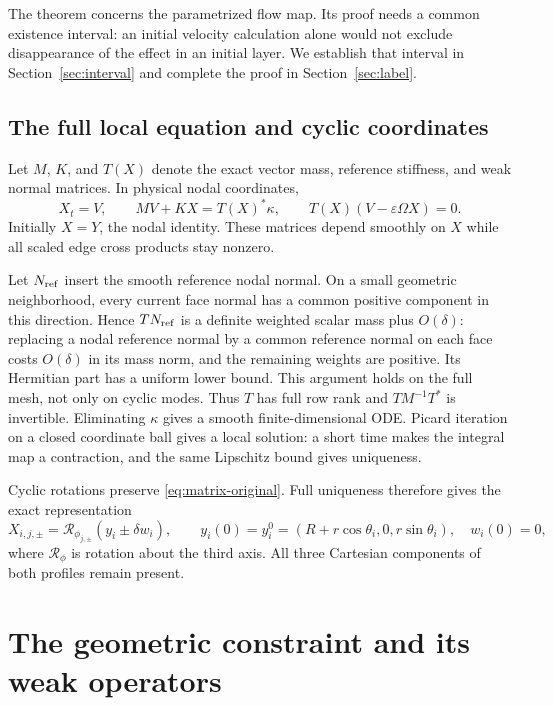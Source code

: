 \documentclass[11pt,a4paper]{article}
\numberwithin{equation}{section}
\theoremstyle{remark}
\begin{document}
The theorem concerns the parametrized flow map. Its proof needs a
common existence interval: an initial velocity calculation alone
would not exclude disappearance of the effect in an initial layer.
We establish that interval in Section~\ref{sec:interval} and complete
the proof in Section~\ref{sec:label}.

\subsection{The full local equation and cyclic coordinates}

Let \(M\), \(K\), and \(T(X)\) denote the exact vector mass, reference
stiffness, and weak normal matrices. In physical nodal coordinates,
\begin{equation}\label{eq:matrix-original}
 X_t=V,\qquad MV+KX=T(X)^*\kappa,\qquad
 T(X)(V-\varepsilon\Omega X)=0 .
\end{equation}
Initially \(X=Y\), the nodal identity. These matrices depend smoothly
on \(X\) while all scaled edge cross products stay nonzero.

Let \(N_{\rm ref}\) insert the smooth reference nodal normal. On a
small geometric neighborhood, every current face normal has a common
positive component in this direction. Hence \(TN_{\rm ref}\) is a
definite weighted scalar mass plus \(O(\delta)\): replacing a nodal
reference normal by a common reference normal on each face costs
\(O(\delta)\) in its mass norm, and the remaining weights are positive.
Its Hermitian part has a uniform lower bound. This argument holds on
the full mesh, not only on cyclic modes. Thus \(T\) has full row rank
and \(TM^{-1}T^*\) is invertible.
Eliminating \(\kappa\) gives a smooth finite-dimensional ODE. Picard
iteration on a closed coordinate ball gives a local solution: a short
time makes the integral map a contraction, and the same Lipschitz
bound gives uniqueness.

Cyclic rotations preserve \eqref{eq:matrix-original}. Full uniqueness
therefore gives the exact representation
\begin{equation}\label{eq:cyclic}
 X_{i,j,\pm}=\mathcal R_{\phi_{j,\pm}}(y_i\pm\delta w_i),
 \qquad
 y_i(0)=y_i^0=(R+r\cos\theta_i,0,r\sin\theta_i),\quad w_i(0)=0 ,
\end{equation}
where \(\mathcal R_\phi\) is rotation about the third axis.
All three Cartesian components of both profiles remain present.

\section{The geometric constraint and its weak operators}\label{sec:operators}
\end{document}
